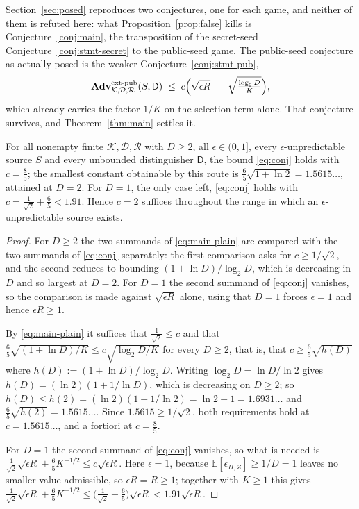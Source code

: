 \documentclass{aicr-solution}
\newcommand{\Adv}{\mathbf{Adv}}
\newcommand{\extp}{\mathrm{ext}\text{-}\mathrm{pub}}
\newcommand{\calK}{\mathcal{K}}
\newcommand{\calD}{\mathcal{D}}
\newcommand{\calR}{\mathcal{R}}
\begin{document}
Section~\ref{sec:posed} reproduces two conjectures, one for each game, and neither of them is
refuted here: what Proposition~\ref{prop:false} kills is Conjecture~\ref{conj:main}, the
transposition of the secret-seed Conjecture~\ref{conj:stmt-secret} to the public-seed game. The
public-seed conjecture as actually posed is the weaker Conjecture~\ref{conj:stmt-pub},
\begin{equation}\label{eq:conj}
  \Adv^{\extp}_{\calK,\calD,\calR}(S,\mathsf{D})
  \;\le\; c\Bigl(\sqrt{\epsilon R} \;+\; \sqrt{\tfrac{\log_2 D}{K}}\Bigr) ,
\end{equation}
which already carries the factor $1/K$ on the selection term alone. That conjecture survives, and
Theorem~\ref{thm:main} settles it.

\begin{corollary}\label{cor:pub}
For all nonempty finite $\calK, \calD, \calR$ with $D \ge 2$, all $\epsilon \in (0,1]$, every
$\epsilon$-unpredictable source $S$ and every unbounded distinguisher $\mathsf{D}$, the bound
\eqref{eq:conj} holds with $c = \tfrac85$; the smallest constant obtainable by this route is
$\tfrac65\sqrt{1 + \ln 2} = 1.5615\ldots$, attained at $D = 2$. For $D = 1$, the only case left,
\eqref{eq:conj} holds with $c = \tfrac{1}{\sqrt2} + \tfrac65 < 1.91$. Hence $c = 2$ suffices
throughout the range in which an $\epsilon$-unpredictable source exists.
\end{corollary}

\begin{proof}
For $D \ge 2$ the two summands of \eqref{eq:main-plain} are compared with the two summands of
\eqref{eq:conj} separately: the first comparison asks for $c \ge 1/\sqrt2$, and the second
reduces to bounding $(1+\ln D)/\log_2 D$, which is decreasing in $D$ and so largest at $D = 2$.
For $D = 1$ the second summand of \eqref{eq:conj} vanishes, so the comparison is made against
$\sqrt{\epsilon R}$ alone, using that $D = 1$ forces $\epsilon = 1$ and hence $\epsilon R \ge 1$.

By \eqref{eq:main-plain} it suffices that $\tfrac{1}{\sqrt2} \le c$ and that
$\tfrac65\sqrt{(1+\ln D)/K} \le c\sqrt{\log_2 D / K}$ for every $D \ge 2$, that is, that
$c \ge \tfrac65\sqrt{h(D)}$ where $h(D) := (1+\ln D)/\log_2 D$. Writing
$\log_2 D = \ln D/\ln 2$ gives $h(D) = (\ln 2)(1 + 1/\ln D)$, which is decreasing on $D \ge 2$;
so $h(D) \le h(2) = (\ln 2)(1 + 1/\ln 2) = \ln 2 + 1 = 1.6931\ldots$ and
$\tfrac65\sqrt{h(2)} = 1.5615\ldots$. Since $1.5615 \ge 1/\sqrt2$, both requirements hold at
$c = 1.5615\ldots$, and a fortiori at $c = \tfrac85$.

For $D = 1$ the second summand of \eqref{eq:conj} vanishes, so what is needed is
$\tfrac{1}{\sqrt2}\sqrt{\epsilon R} + \tfrac65 K^{-1/2} \le c\sqrt{\epsilon R}$. Here $\epsilon = 1$,
because $\mathbb{E}[\epsilon_{H,Z}] \ge 1/D = 1$ leaves no smaller value admissible, so
$\epsilon R = R \ge 1$; together with $K \ge 1$ this gives
$\tfrac{1}{\sqrt2}\sqrt{\epsilon R} + \tfrac65 K^{-1/2} \le
\bigl(\tfrac{1}{\sqrt2} + \tfrac65\bigr)\sqrt{\epsilon R} < 1.91\sqrt{\epsilon R}$.
\end{proof}
\end{document}

